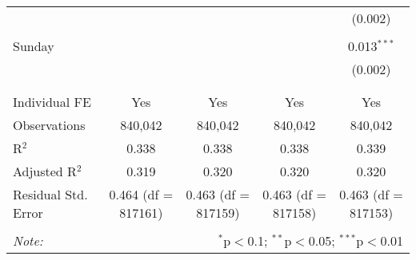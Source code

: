 \documentclass[
]{article}
\begin{document}
\begin{table}[!htbp]
{\begin{tabular}{@{\extracolsep{5pt}}lcccc}
  &  &  &  & (0.002) \\ 
  & & & & \\ 
 Sunday &  &  &  & 0.013$^{***}$ \\ 
  &  &  &  & (0.002) \\ 
  & & & & \\ 
\hline \\[-1.8ex] 
Individual FE & Yes & Yes & Yes & Yes \\ 
Observations & 840,042 & 840,042 & 840,042 & 840,042 \\ 
R$^{2}$ & 0.338 & 0.338 & 0.338 & 0.339 \\ 
Adjusted R$^{2}$ & 0.319 & 0.320 & 0.320 & 0.320 \\ 
Residual Std. Error & 0.464 (df = 817161) & 0.463 (df = 817159) & 0.463 (df = 817158) & 0.463 (df = 817153) \\ 
\hline 
\hline \\[-1.8ex] 
\textit{Note:}  & \multicolumn{4}{r}{$^{*}$p$<$0.1; $^{**}$p$<$0.05; $^{***}$p$<$0.01} \\ 
\end{tabular}
} 
\end{table} 
\newpage
\end{document}
